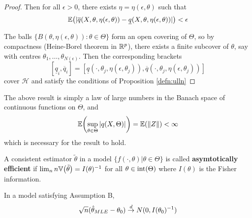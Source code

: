 \begin{proof}
  Then for all $\epsilon > 0$, there exists $\eta = \eta(\epsilon,
  \theta)$ such that
  \begin{equation}
    \label{eq:58}
    \E{|\overline q(X, \theta, \eta(\epsilon, \theta)) - \underline
      q(X, \theta, \eta(\epsilon, \theta))|} < \epsilon
  \end{equation}

  The balls $\{ B(\theta, \eta(\epsilon, \theta)) : \theta \in \Theta
  \}$ form an open covering of $\Theta$, so by compactness
  (Heine-Borel theorem in $\mathbb{R}^{p}$), there exists a finite subcover of
  $\theta$, say with centres $\theta_{1}, \dots,
  \theta_{N(\epsilon)}$.  Then the corresponding brackets
  \begin{equation}
    \label{eq:59}
    [\underline q_{i}, \overline q_{i}] = [ \underline q(\cdot,
    \theta_{j}, \eta(\epsilon, \theta_{j})), \overline q(\cdot,
    \theta_{j}, \eta(\epsilon, \theta_{j}))]
  \end{equation} cover $\mathcal{H}$ and satisfy the conditions of
  Proposition \ref{defn:ulln}
\end{proof}

\begin{remark}
  The above result is simply a law of large numbers in the Banach
  space of continuous functions on $\Theta$, and
  \begin{equation}
    \label{eq:60}
    \E{\sup_{\theta \in \Theta} | q(X, \Theta) |} = \E{\|Z\|} < \infty
  \end{equation} which is necessary for the result to hold.
\end{remark}


\begin{defn}
  \label{defn:parametric_statistical_models:6}
  A consistent estimator $\tilde \theta$ in a model $\{ f(\cdot,
  \theta) | \theta \in \Theta \}$ is called \textbf{asymtotically
    efficient} if $\lim_{n} n \Var{\tilde \theta} = I(\theta)^{-1}$
  for all $\theta \in \operatorname*{int} (\Theta)$ where $I(\theta)$ is the Fisher information.
\end{defn}

\begin{thm}
  \label{defn:parametric_statistical_models:7}
  In a model satisfying Assumption B,
  \begin{equation}
    \label{eq:39}
    \sqrt{n} (\hat \theta_{MLE} - \theta_{0}) \overset{d}{\rightarrow} N(0, I(\theta_{0})^{-1})
  \end{equation}
\end{thm}

